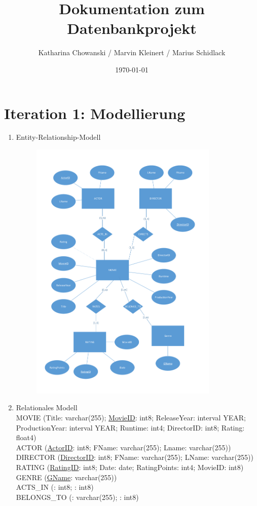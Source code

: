 \documentclass[a4paper,11pt]{article}
\title{Dokumentation zum Datenbankprojekt}
\author{Katharina Chowanski / Marvin Kleinert / Marius Schidlack}
\date{\today}
\begin{document}
\maketitle 

\section*{Iteration 1: Modellierung}
\begin{enumerate}
\item Entity-Relationship-Modell
\begin{figure}[htbp]
	\centering
		\includegraphics[width=0.85\textwidth]{MoviesER_Portrait.pdf}
	\label{fig:MoviesER}
\end{figure}

\item Relationales Modell \\[0.5cm]
MOVIE (Title: varchar(255); \uline{MovieID}: int8; ReleaseYear: interval YEAR; ProductionYear: interval YEAR; Runtime: int4; DirectorID: int8; Rating: float4)\\[0.5cm]
ACTOR (\uline{ActorID}: int8; FName: varchar(255); Lname: varchar(255))\\[0.5cm]
DIRECTOR (\uline{DirectorID}: int8; FName: varchar(255); LName: varchar(255))\\[0.5cm]
RATING (\uline{RatingID}: int8; Date: date; RatingPoints: int4; MovieID: int8)\\[0.5cm]
GENRE (\uline{GName}: varchar(255))\\[0.5cm]
ACTS\_IN (\underline{}: int8; \underline{}: int8)\\[0.5cm]
BELONGS\_TO (\underline{}: varchar(255); \underline{}: int8)\\[0.5cm]


\end{enumerate}
\end{document}
